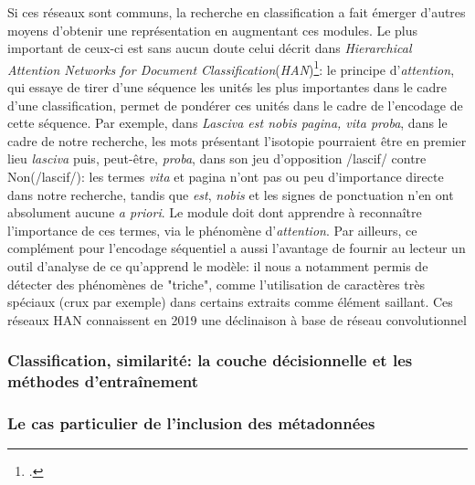 Si ces réseaux sont communs, la recherche en classification a fait émerger d'autres moyens d'obtenir une représentation en augmentant ces modules. Le plus important de ceux-ci est sans aucun doute celui décrit dans \textit{Hierarchical Attention Networks for Document Classification}(\textit{HAN})\footcite{yang}: le principe d'\textit{attention}, qui essaye de tirer d'une séquence les unités les plus importantes dans le cadre d'une classification, permet de pondérer ces unités dans le cadre de l'encodage de cette séquence. Par exemple, dans \textit{Lasciva est nobis pagina, vita proba}, dans le cadre de notre recherche, les mots présentant l'isotopie pourraient être en premier lieu \textit{lasciva} puis, peut-être, \textit{proba}, dans son jeu d'opposition /lascif/ contre Non(/lascif/): les termes \textit{vita} et {pagina} n'ont pas ou peu d'importance directe dans notre recherche, tandis que \textit{est}, \textit{nobis} et les signes de ponctuation n'en ont absolument aucune \textit{a priori}. Le module doit dont apprendre à reconnaître l'importance de ces termes, via le phénomène d'\textit{attention}. Par ailleurs, ce complément pour l'encodage séquentiel a aussi l'avantage de fournir au lecteur un outil d'analyse de ce qu'apprend le modèle: il nous a notamment permis de détecter des phénomènes de "triche", comme l'utilisation de caractères très spéciaux (crux par exemple) dans certains extraits comme élément saillant. Ces réseaux HAN connaissent en 2019 une déclinaison à base de réseau convolutionnel



\subsubsection{Classification, similarité: la couche décisionnelle et les méthodes d'entraînement}


\subsubsection{Le cas particulier de l'inclusion des métadonnées}

